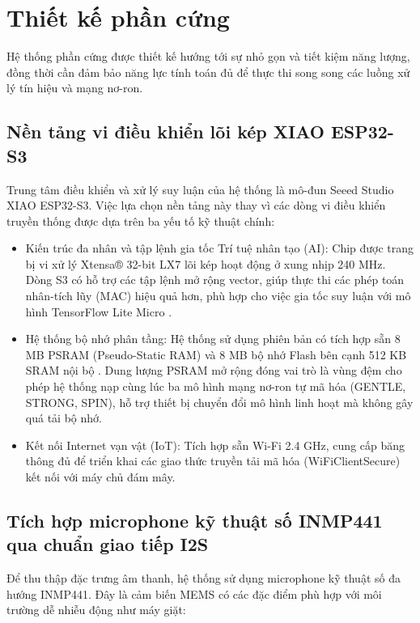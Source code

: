 ﻿

\section{Thiết kế phần cứng}

Hệ thống phần cứng được thiết kế hướng tới sự nhỏ gọn và tiết kiệm năng lượng, đồng thời cần đảm bảo năng lực tính toán đủ để thực thi song song các luồng xử lý tín hiệu và mạng nơ-ron.

\subsection{Nền tảng vi điều khiển lõi kép XIAO ESP32-S3}

Trung tâm điều khiển và xử lý suy luận của hệ thống là mô-đun Seeed Studio XIAO ESP32-S3. Việc lựa chọn nền tảng này thay vì các dòng vi điều khiển truyền thống được dựa trên ba yếu tố kỹ thuật chính:

\begin{itemize}
    \item Kiến trúc đa nhân và tập lệnh gia tốc Trí tuệ nhân tạo (AI): Chip được trang bị vi xử lý Xtensa® 32-bit LX7 lõi kép hoạt động ở xung nhịp 240 MHz. Dòng S3 có hỗ trợ các tập lệnh mở rộng vector, giúp thực thi các phép toán nhân-tích lũy (MAC) hiệu quả hơn, phù hợp cho việc gia tốc suy luận với mô hình TensorFlow Lite Micro \cite{ref_1_15}.
    \item Hệ thống bộ nhớ phân tầng: Hệ thống sử dụng phiên bản có tích hợp sẵn 8 MB PSRAM (Pseudo-Static RAM) và 8 MB bộ nhớ Flash bên cạnh 512 KB SRAM nội bộ . Dung lượng PSRAM mở rộng đóng vai trò là vùng đệm cho phép hệ thống nạp cùng lúc ba mô hình mạng nơ-ron tự mã hóa (GENTLE, STRONG, SPIN), hỗ trợ thiết bị chuyển đổi mô hình linh hoạt mà không gây quá tải bộ nhớ.
    \item Kết nối Internet vạn vật (IoT): Tích hợp sẵn Wi-Fi 2.4 GHz, cung cấp băng thông đủ để triển khai các giao thức truyền tải mã hóa (WiFiClientSecure) kết nối với máy chủ đám mây.
\end{itemize}

\subsection{Tích hợp microphone kỹ thuật số INMP441 qua chuẩn giao tiếp I2S}

Để thu thập đặc trưng âm thanh, hệ thống sử dụng microphone kỹ thuật số đa hướng INMP441. Đây là cảm biến MEMS có các đặc điểm phù hợp với môi trường dễ nhiễu động như máy giặt:

